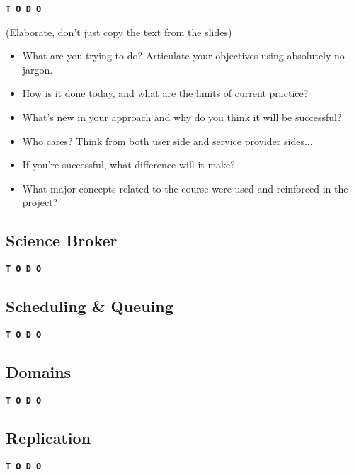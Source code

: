 \documentclass{ReportCUNY}
\begin{document}
\begin{center}\textbf{\texttt{T~O~D~O}}\end{center}
(Elaborate, don't just copy the text from the slides)

\begin{itemize}
	\item What are you trying to do? Articulate your objectives using absolutely no jargon.
	\item How is it done today, and what are the limits of current practice?
	\item What's new in your approach and why do you think it will be successful?
	\item Who cares? Think from both user side and service provider sides...
	\item If you're successful, what difference will it make?
	\item What major concepts related to the course were used and reinforced in the project?
\end{itemize}


\subsection{Science Broker}

\begin{center}\textbf{\texttt{T~O~D~O}}\end{center}


\subsection{Scheduling \& Queuing}

\begin{center}\textbf{\texttt{T~O~D~O}}\end{center}


\subsection{Domains}

\begin{center}\textbf{\texttt{T~O~D~O}}\end{center}


\subsection{Replication}

\begin{center}\textbf{\texttt{T~O~D~O}}\end{center}
\end{document}
